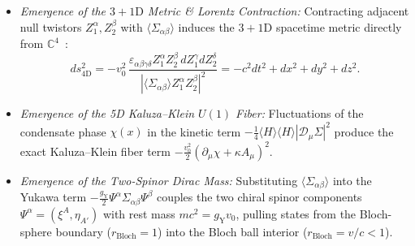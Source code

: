 \documentclass[11pt,a4paper]{article}
\begin{document}
\begin{enumerate}
\begin{equation}
    \end{equation}
    \begin{itemize}
        \item \emph{Emergence of the $3+1\text{D}$ Metric \& Lorentz Contraction:} Contracting adjacent null twistors $Z_1^\alpha, Z_2^\beta$ with $\langle \Sigma_{\alpha\beta} \rangle$ induces the $3+1\text{D}$ spacetime metric directly from $\mathbb{C}^4$~\cite{PenroseRindler1984}:
        \begin{equation}
        ds_{4\text{D}}^2 = -v_0^2\, \frac{\varepsilon_{\alpha\beta\gamma\delta} Z_1^\alpha Z_2^\beta\, dZ_1^\gamma dZ_2^\delta}{\left| \langle \Sigma_{\alpha\beta} \rangle Z_1^\alpha Z_2^\beta \right|^2} = -c^2 dt^2 + dx^2 + dy^2 + dz^2.
        \end{equation}
        \item \emph{Emergence of the 5D Kaluza--Klein $U(1)$ Fiber:} Fluctuations of the condensate phase $\chi(x)$ in the kinetic term $-\frac{1}{4}\langle H\rangle\langle H\rangle |\mathcal{D}_\mu \Sigma|^2$ produce the exact Kaluza--Klein fiber term $-\frac{v_0^2}{2}(\partial_\mu \chi + \kappa A_\mu)^2$.
        \item \emph{Emergence of the Two-Spinor Dirac Mass:} Substituting $\langle \Sigma_{\alpha\beta} \rangle$ into the Yukawa term $-\frac{g_{\text{Y}}}{2} \Psi^\alpha \Sigma_{\alpha\beta} \Psi^\beta$ couples the two chiral spinor components $\Psi^\alpha = (\xi^A, \eta_{A'})$ with rest mass $mc^2 = g_{\text{Y}} v_0$, pulling states from the Bloch-sphere boundary ($r_{\text{Bloch}} = 1$) into the Bloch ball interior ($r_{\text{Bloch}} = v/c < 1$).
    \end{itemize}
\end{enumerate}
\end{document}

